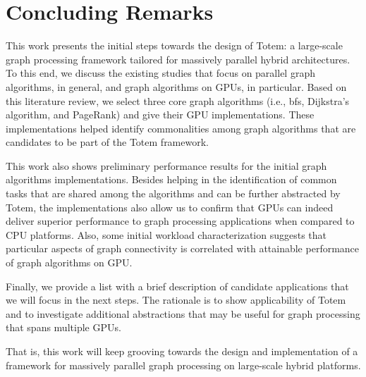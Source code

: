 \section{Concluding Remarks}
\label{sec:conclusion}
This work presents the initial steps towards the design of {\sc Totem}: a large-scale graph processing framework tailored for massively parallel hybrid architectures. To this end, we discuss the existing studies that focus on parallel graph algorithms, in general, and graph algorithms on GPUs, in particular. Based on this literature review, we select three core graph algorithms (i.e., {\sc bfs}, Dijkstra's algorithm, and PageRank) and give their GPU implementations. These implementations helped identify commonalities among graph algorithms that are candidates to be part of the {\sc Totem} framework. 

This work also shows preliminary performance results for the initial graph algorithms implementations. Besides helping in the identification of common tasks that are shared among the algorithms and can be further abstracted by {\sc Totem}, the implementations also allow us to confirm that GPUs can indeed deliver superior performance to graph processing applications when compared to CPU platforms. Also, some initial workload characterization suggests that particular aspects of graph connectivity is correlated with attainable performance of graph algorithms on GPU. 

Finally, we provide a list with a brief description of candidate applications that we will focus in the next steps. The rationale is to show applicability of {\sc Totem} and to investigate additional abstractions that may be useful for graph processing that spans multiple GPUs. 

That is, this work will keep grooving towards the design and implementation of a framework for massively parallel graph processing on large-scale hybrid platforms.
